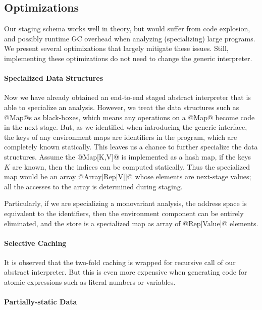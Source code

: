 \subsection{Optimizations} \label{staged_ds}

Our staging schema works well in theory, but would suffer from code explosion,
and possibly runtime GC overhead when analyzing (specializing) large programs.
We present several optimizations that largely mitigate these issues. Still,
implementing these optimizations do not need to change the generic interpreter.

\paragraph{Specialized Data Structures}

Now we have already obtained an end-to-end staged abstract interpreter that is
able to specialize an analysis. However, we treat the data structures such as
@Map@s as black-boxes, which means any operations on a @Map@ become code in the
next stage. But, as we identified when introducing the generic interface, the
keys of any environment maps are identifiers in the program, which are
completely known statically. This leaves us a chance to further specialize the
data structures. Assume the @Map[K,V]@ is implemented as a hash map, if the keys
$K$ are known, then the indices can be computed statically. Thus the specialized
map would be an array @Array[Rep[V]]@ whose elements are next-stage values; all
the accesses to the array is determined during staging.

Particularly, if we are specializing a monovariant analysis, the address space
is equivalent to the identifiers, then the environment component can be entirely
eliminated, and the store is a specialized map as array of @Rep[Value]@
elements.

\paragraph{Selective Caching} It is observed that the two-fold caching is
wrapped for recursive call of our abstract interpreter. But this is even more
expensive when generating code for atomic expressions such as literal numbers or
variables. 

\paragraph{Partially-static Data}

